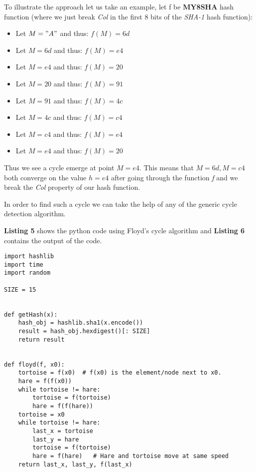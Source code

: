 \documentclass[10pt,a4paper,oneside]{article}
\begin{document}
\begin{itemize}
To illustrate the approach let us take an example, let f be \textbf{MY8SHA} hash function (where we just break \textit{Col} in the first 8 bits of the \textit{SHA-1} hash function):\newline
\begin{itemize}
\item Let \( M = "A" \) and thus: \( f(M) = 6d \)
\item Let \( M = 6d \) and thus: \( f(M) = e4 \)
\item Let \( M = e4 \) and thus: \( f(M) = 20 \)
\item Let \( M = 20 \) and thus: \( f(M) = 91 \)
\item Let \( M = 91 \) and thus: \( f(M) = 4c \)
\item Let \( M = 4c \) and thus: \( f(M) = c4 \)
\item Let \( M = c4 \) and thus: \( f(M) = e4 \)
\item Let \( M = e4 \) and thus: \( f(M) = 20 \)
\end{itemize}
Thus we see a cycle emerge at point \( M = e4 \). This means that \( M = 6d,  M = c4 \) both converge on the value \( h = e4 \) after going through the function \textit{f} and we break the \textit{Col} property of our hash function.\newline

In order to find such a cycle we can take the help of any of the generic cycle detection algorithm.\newline

\textbf{Listing 5} shows the python code using Floyd's cycle algorithm \cite{floyd}  and \textbf{Listing 6} contains the output of the code.

\lstset{showstringspaces=false}
\begin{lstlisting}
import hashlib
import time
import random

SIZE = 15


def getHash(x):
    hash_obj = hashlib.sha1(x.encode())
    result = hash_obj.hexdigest()[: SIZE]
    return result


def floyd(f, x0):
    tortoise = f(x0)  # f(x0) is the element/node next to x0.
    hare = f(f(x0))
    while tortoise != hare:
        tortoise = f(tortoise)
        hare = f(f(hare))
    tortoise = x0
    while tortoise != hare:
        last_x = tortoise
        last_y = hare
        tortoise = f(tortoise)
        hare = f(hare)   # Hare and tortoise move at same speed
    return last_x, last_y, f(last_x)



\end{lstlisting}
\end{itemize}
\end{document}
